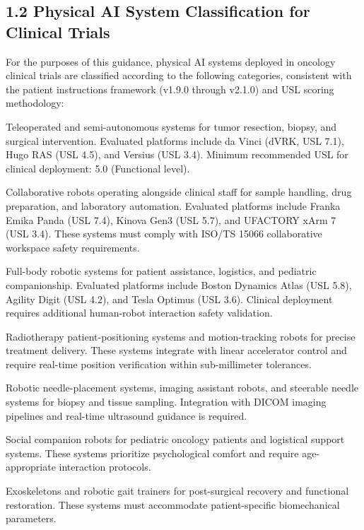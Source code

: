 \documentclass[11pt]{article}
\begin{document}
\subsection{1.2 Physical AI System Classification for Clinical Trials}

For the purposes of this guidance, physical AI systems deployed in oncology clinical trials are classified according to the following categories, consistent with the patient instructions framework (v1.9.0 through v2.1.0) and USL scoring methodology:

\begin{description}[leftmargin=2.5cm,style=sameline]

\item[Surgical Robots] Teleoperated and semi-autonomous systems for tumor resection, biopsy, and surgical intervention. Evaluated platforms include da Vinci (dVRK, USL 7.1), Hugo RAS (USL 4.5), and Versius (USL 3.4). Minimum recommended USL for clinical deployment: 5.0 (Functional level).

\item[Cobots] Collaborative robots operating alongside clinical staff for sample handling, drug preparation, and laboratory automation. Evaluated platforms include Franka Emika Panda (USL 7.4), Kinova Gen3 (USL 5.7), and UFACTORY xArm 7 (USL 3.4). These systems must comply with ISO/TS 15066 collaborative workspace safety requirements.

\item[Humanoid Robots] Full-body robotic systems for patient assistance, logistics, and pediatric companionship. Evaluated platforms include Boston Dynamics Atlas (USL 5.8), Agility Digit (USL 4.2), and Tesla Optimus (USL 3.6). Clinical deployment requires additional human-robot interaction safety validation.

\item[Therapeutic Robots] Radiotherapy patient-positioning systems and motion-tracking robots for precise treatment delivery. These systems integrate with linear accelerator control and require real-time position verification within sub-millimeter tolerances.

\item[Diagnostic Robots] Robotic needle-placement systems, imaging assistant robots, and steerable needle systems for biopsy and tissue sampling. Integration with DICOM imaging pipelines and real-time ultrasound guidance is required.

\item[Assistive Robots] Social companion robots for pediatric oncology patients and logistical support systems. These systems prioritize psychological comfort and require age-appropriate interaction protocols.

\item[Rehabilitative Robots] Exoskeletons and robotic gait trainers for post-surgical recovery and functional restoration. These systems must accommodate patient-specific biomechanical parameters.

\end{description}
\end{document}
